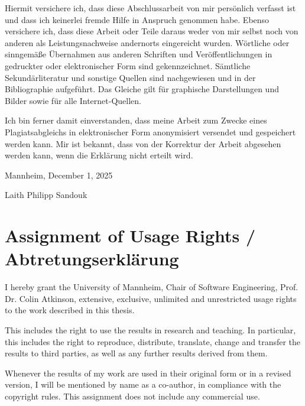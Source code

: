 \begin{appendices}
\vspace{-0.3cm}

\hrulefill

\vspace{-0.2cm}
Hiermit versichere ich, dass diese Abschlussarbeit von mir persönlich verfasst
ist und dass ich keinerlei fremde Hilfe in Anspruch genommen habe. Ebenso
versichere ich, dass diese Arbeit oder Teile daraus weder von mir selbst noch
von anderen als Leistungsnachweise andernorts eingereicht wurden. Wörtliche oder
sinn\-gemäße Übernahmen aus anderen Schriften und Veröffentlichungen in gedruckter
oder elektronischer Form sind gekennzeichnet. Sämtliche Sekundärliteratur und
sonstige Quellen sind nachgewiesen und in der Bibliographie aufgeführt. Das
Glei\-che gilt für graphische Darstellungen und Bilder sowie für alle
Internet-Quellen.

Ich bin ferner damit einverstanden, dass meine Arbeit zum Zwecke eines
Plagiatsabgleichs in elektronischer Form anonymisiert versendet und gespeichert
werden kann. Mir ist bekannt, dass von der Korrektur der Arbeit abgesehen werden
kann, wenn die Erklärung nicht erteilt wird.

\vspace{1.0cm}

Mannheim, December 1, 2025

\vspace{1.5cm}

Laith Philipp Sandouk

\clearpage

\section{\large Assignment of Usage Rights / Abtretungserkl\"arung}
\pagestyle{empty}
I hereby grant the University of Mannheim, Chair of Software Engineering, Prof. Dr. Colin Atkinson, extensive, exclusive, unlimited and unrestricted usage rights to the work described in this thesis. 

This includes the right to use the results in research and teaching. In particular, this includes the right to reproduce, distribute, translate, change and transfer the results to third parties, as well as any further results derived from them.

Whenever the results of my work are used in their original form or in a revised version, I will be mentioned by name as a co-author, in compliance with the copyright rules. This assignment does not include any commercial use.


\end{appendices}
